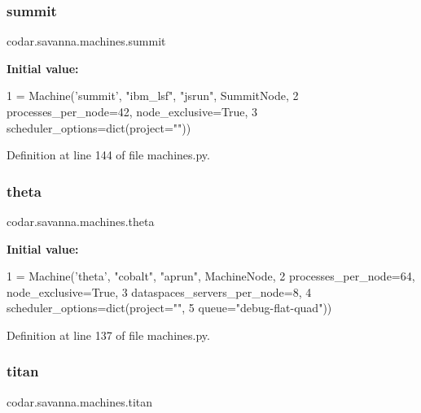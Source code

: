 \subsubsection{\texorpdfstring{summit}{summit}}
{\footnotesize\ttfamily codar.\+savanna.\+machines.\+summit}

{\bfseries Initial value\+:}
\begin{DoxyCode}
1 =  Machine(\textcolor{stringliteral}{'summit'}, \textcolor{stringliteral}{"ibm\_lsf"}, \textcolor{stringliteral}{"jsrun"}, SummitNode,
2                  processes\_per\_node=42, node\_exclusive=\textcolor{keyword}{True},
3                  scheduler\_options=dict(project=\textcolor{stringliteral}{""}))
\end{DoxyCode}


Definition at line 144 of file machines.\+py.

\mbox{\label{namespacecodar_1_1savanna_1_1machines_aa6fd3932b348a23c463f4f1d81e3a130}} 
\subsubsection{\texorpdfstring{theta}{theta}}
{\footnotesize\ttfamily codar.\+savanna.\+machines.\+theta}

{\bfseries Initial value\+:}
\begin{DoxyCode}
1 =  Machine(\textcolor{stringliteral}{'theta'}, \textcolor{stringliteral}{"cobalt"}, \textcolor{stringliteral}{"aprun"}, MachineNode,
2                 processes\_per\_node=64, node\_exclusive=\textcolor{keyword}{True},
3                 dataspaces\_servers\_per\_node=8,
4                 scheduler\_options=dict(project=\textcolor{stringliteral}{""},
5                                        queue=\textcolor{stringliteral}{"debug-flat-quad"}))
\end{DoxyCode}


Definition at line 137 of file machines.\+py.

\mbox{\label{namespacecodar_1_1savanna_1_1machines_ad70e3909df8e02f3a0cb9ab6aff13ce5}} 
\subsubsection{\texorpdfstring{titan}{titan}}
{\footnotesize\ttfamily codar.\+savanna.\+machines.\+titan}

